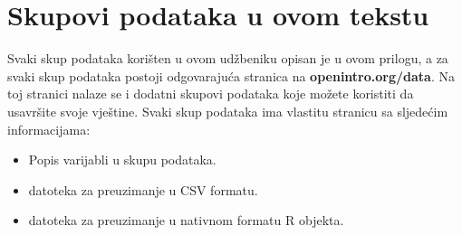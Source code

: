 \chapter{Skupovi podataka u ovom tekstu}

\label{appendix_data}
\label{data_appendix}



Svaki skup podataka korišten u ovom udžbeniku opisan je u ovom prilogu,
a za svaki skup podataka postoji odgovarajuća stranica na
{\color{black}\textbf{openintro.org/data}}.
Na toj stranici nalaze se i dodatni skupovi podataka koje možete koristiti
da usavršite svoje vještine.
Svaki skup podataka ima vlastitu stranicu sa sljedećim informacijama:
\begin{itemize}
	\setlength{\itemsep}{0mm}
	\item
	Popis varijabli u skupu podataka.
	\item
	datoteka za preuzimanje u CSV formatu.
	\item
	datoteka za preuzimanje u nativnom formatu R objekta.
\end{itemize}%


%


\newcommand{\datawrap}[1]{#1 $\to$}

